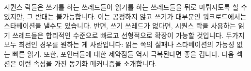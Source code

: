 시퀀스 락들은 쓰기를 하는 쓰레드들이 읽기를 하는 쓰레드들을 뒤로 미뤄지도록 할
수 있지만, 그 반대는 불가능합니다.
이는 공정하지 않고 쓰기가 대부분인 워크로드에서는 스타베이션을 낼수도
있습니다.
반면, 쓰기 쓰레드가 없다면, 시퀀스 락을 사용하는 읽기 쓰레드들은 합리적인
수준으로 빠르고 선형적으로 확장이 가능할 것입니다.
두가지 모두 최선인 경우를 원하는 게 사람입니다: 읽는 쪽의 실패나 스타베이션의
가능성 없는 빠른 읽기.
또한, 포인터들에 대한 제약점들 역시 극복된다면 좋을 겁니다.
다음 섹션은 이런 속성을 가진 동기화 메커니즘을 소개합니다.

